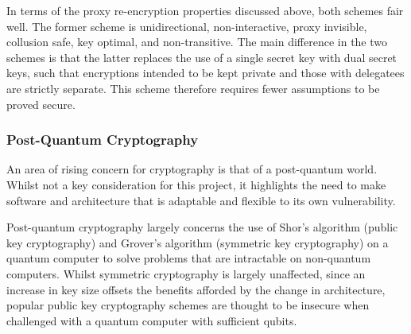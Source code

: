In terms of the proxy re-encryption properties discussed above, both schemes fair well. The former scheme is unidirectional, non-interactive, proxy invisible, collusion safe, key optimal, and non-transitive. The main difference in the two schemes is that the latter replaces the use of a single secret key with dual secret keys, such that encryptions intended to be kept private and those with delegatees are strictly separate. This scheme therefore requires fewer assumptions to be proved secure.


\subsubsection{Post-Quantum Cryptography}

An area of rising concern for cryptography is that of a post-quantum world. Whilst not a key consideration for this project, it highlights the need to make software and architecture that is adaptable and flexible to its own vulnerability.

Post-quantum cryptography largely concerns the use of Shor's algorithm (public key cryptography) and Grover's algorithm (symmetric key cryptography) on a quantum computer to solve problems that are intractable on non-quantum computers. Whilst symmetric cryptography is largely unaffected, since an increase in key size offsets the benefits afforded by the change in architecture, popular public key cryptography schemes are thought to be insecure when challenged with a quantum computer with sufficient qubits.

\cite{lv11:2011:article}
